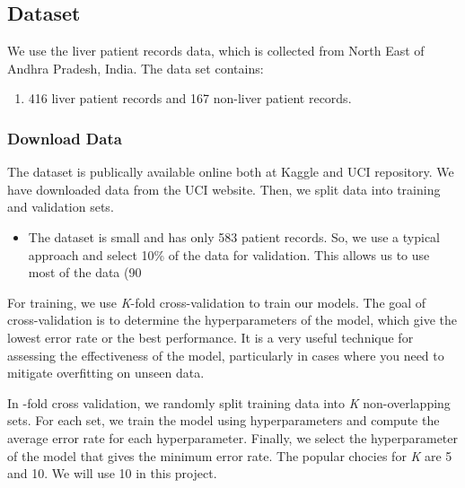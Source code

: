\documentclass[]{article}
\begin{document}
\subsection{Dataset}
\label{sec:dataset}

We use the liver patient records data, which is collected from North
East of Andhra Pradesh, India. The data set contains:

\begin{enumerate}
\item 416 liver patient records and 167 non-liver patient records.
\end{enumerate}

\subsubsection{Download Data}
\label{sec:dd}

The dataset is publically available online both at Kaggle and UCI
repository. We have downloaded data from the UCI website. Then, we split
data into training and validation sets.

\begin{itemize}
\item The dataset is small and has only 583 patient records. So, we use a typical approach and select 10\% of the data for validation. This allows us to use most of the data (90%
\end{itemize}

For training, we use \emph{K}-fold cross-validation to train our models.
The goal of cross-validation is to determine the hyperparameters of the
model, which give the lowest error rate or the best performance. It is a
very useful technique for assessing the effectiveness of the model,
particularly in cases where you need to mitigate overfitting on unseen
data.

In -fold cross validation, we randomly split training data into
\emph{K} non-overlapping sets. For each set, we train the model using
hyperparameters and compute the average error rate for each
hyperparameter. Finally, we select the hyperparameter of the model that
gives the minimum error rate. The popular chocies for \emph{K} are 5 and
10. We will use 10 in this project.
\end{document}
